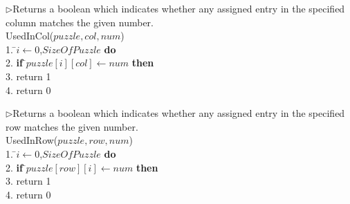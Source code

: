 \documentclass[12pt, letterpaper]{article}
\begin{document}
            \begin{center}
            \begin{tabbing}
            $\rhd$Returns a boolean which indicates whether any assigned entry
               in the specified\\ column matches the given number.\\
            UsedInCol($puzzle, col, num $) \\
            1.  \=$i \leftarrow 0$,$SizeOfPuzzle$ {\bf do} \\
            2. \indent            \> {\bf if} \=$puzzle[i][col] \leftarrow num$ {\bf then} \\
            3. \indent 	      \> 	\>  return 1 \\
            4. \indent return 0 \\
            \end{tabbing}
            \label{fig_alg_ex}
            \end{center}
            
            \newpage
            
            \begin{center}
            \begin{tabbing}
            $\rhd$Returns a boolean which indicates whether any assigned entry
               in the specified\\ row matches the given number.\\
            UsedInRow($puzzle, row, num $) \\
            1.  \=$i \leftarrow 0$,$SizeOfPuzzle$ {\bf do} \\
            2. \indent            \> {\bf if} \=$puzzle[row][i] \leftarrow num$ {\bf then} \\
            3. \indent 	      \> 	\>  return 1 \\
            4. \indent return 0 \\
            \end{tabbing}
            \label{fig_alg_ex}
            \end{center}
\end{document}
